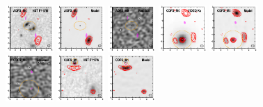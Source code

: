 \documentclass[iop]{emulateapj}
\begin{document}
\begin{figure}[!tbp]
\begin{centering}
\includegraphics[width=0.162\textwidth]{../Figures/modelfit/ADFS_M0_optical_bestfit.pdf}
\includegraphics[width=0.162\textwidth]{../Figures/modelfit/ADFS_M0_model_bestfit.pdf}
\includegraphics[width=0.162\textwidth]{../Figures/modelfit/ADFS_M0_residual_bestfit.pdf}
\includegraphics[width=0.162\textwidth]{../Figures/modelfit/CDFS_M0_optical_bestfit.pdf}
\includegraphics[width=0.162\textwidth]{../Figures/modelfit/CDFS_M0_model_bestfit.pdf}
\includegraphics[width=0.162\textwidth]{../Figures/modelfit/CDFS_M0_residual_bestfit.pdf}
\includegraphics[width=0.162\textwidth]{../Figures/modelfit/CDFS_M1_optical_bestfit.pdf}
\includegraphics[width=0.162\textwidth]{../Figures/modelfit/CDFS_M1_model_bestfit.pdf}

\end{centering}
\end{figure}
\end{document}
